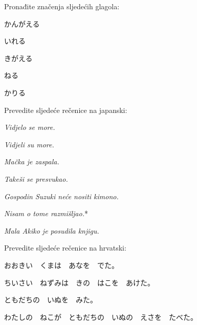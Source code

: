 
\author{Tomislav Mamić}

	
	\begin{mondai}{Pronađite značenja sljedećih glagola:}
		\item かんがえる
		\item いれる
		\item きがえる
		\item ねる
		\item かりる
	\end{mondai}

	\begin{mondai}{Prevedite sljedeće rečenice na japanski:}
		\item \textit{Vidjelo se more.}
		\item \textit{Vidjeli su more.}
		\item \textit{Mačka je zaspala.}
		\item \textit{Takeši se presvukao.}
		\item \textit{Gospodin Suzuki neće nositi kimono.}
		\item \textit{Nisam o tome razmišljao.}*
		\item \textit{Mala Akiko je posudila knjigu.}
	\end{mondai}

	\begin{mondai}{Prevedite sljedeće rečenice na hrvatski:}
		\item おおきい　くまは　あなを　でた。
		\item ちいさい　ねずみは　きの　はこを　あけた。
		\item ともだちの　いぬを　みた。
		\item わたしの　ねこが　ともだちの　いぬの　えさを　たべた。
	\end{mondai}
